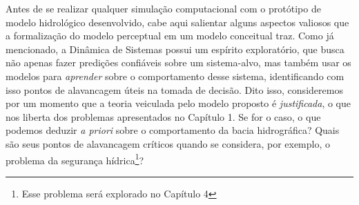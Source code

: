 \documentclass[./main.tex]{subfiles}
\begin{document}
\par Antes de se realizar qualquer simulação computacional com o protótipo de modelo hidrológico desenvolvido, cabe aqui salientar alguns aspectos valiosos que a formalização do modelo perceptual em um modelo conceitual traz. Como já mencionado, a Dinâmica de Sistemas possui um espírito exploratório, que busca não apenas fazer predições confiáveis sobre um sistema-alvo, mas também usar os modelos para \textit{aprender} sobre o comportamento desse sistema, identificando com isso pontos de alavancagem úteis na tomada de decisão. Dito isso, consideremos por um momento que a teoria veiculada pelo modelo proposto é \textit{justificada}, o que nos liberta dos problemas apresentados no Capítulo 1. Se for o caso, o que podemos deduzir \textit{a priori} sobre o comportamento da bacia hidrográfica? Quais são seus pontos de alavancagem críticos quando se considera, por exemplo, o problema da segurança hídrica\footnote{Esse problema será explorado no Capítulo 4}?  
\end{document}

